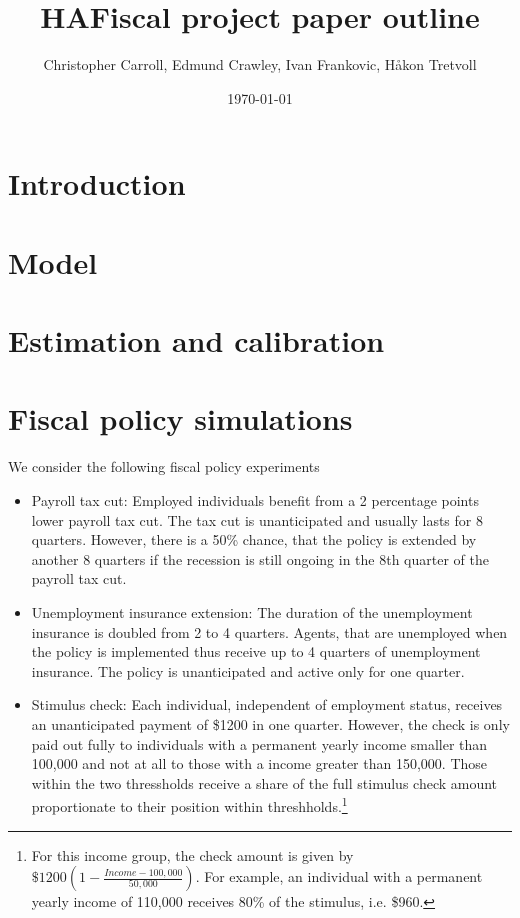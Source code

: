 \documentclass[11pt]{article}
\title{ HAFiscal project paper outline}
\author{Christopher Carroll, Edmund Crawley, Ivan Frankovic, Håkon Tretvoll}
\date{\today}
\begin{document}
	\maketitle
	
	
	\section{Introduction}
	
	\section{Model}
	
	\section{Estimation and calibration}
	
	\section{Fiscal policy simulations}
	
	We consider the following fiscal policy experiments
	
	\begin{itemize}
		\item Payroll tax cut: Employed individuals benefit from a 2 percentage points lower payroll tax cut. The tax cut is unanticipated and usually lasts for 8 quarters. However, there is a 50\% chance, that the policy is extended by another 8 quarters if the recession is still ongoing in the 8th quarter of the payroll tax cut. 
		\item Unemployment insurance extension: The duration of the unemployment insurance is doubled from 2 to 4 quarters. Agents, that are unemployed when the policy is implemented thus receive up to 4 quarters of unemployment insurance. The policy is unanticipated and active only for one quarter.
		\item Stimulus check: Each individual, independent of employment status, receives an unanticipated payment of \$1200 in one quarter. However, the check is only paid out fully to individuals with a permanent yearly income smaller than 100,000 and not at all to those with a income greater than 150,000. Those within the two thressholds receive a share of the full stimulus check amount proportionate to their position within threshholds.\footnote{For this income group, the check amount is given by $\$1200 (1-\frac{Income-100,000}{50,000})$. For example, an individual with a permanent yearly income of 110,000 receives 80\% of the stimulus, i.e. \$960.}
	\end{itemize}
	
\end{document}
